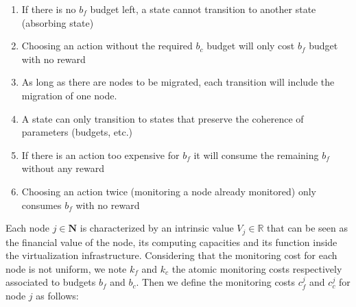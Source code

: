 \begin{enumerate}
    \item If there is no $b_f$ budget left, a state cannot transition to another state (absorbing state)
    \label{cond:c1}
    \item Choosing an action without the required $b_c$ budget will only cost $b_f$ budget with no reward
    \label{cond:c2}
    \item As long as there are nodes to be migrated, each transition will include the migration of one node.
    \label{cond:c3}
    \item A state can only transition to states that preserve the coherence of parameters (budgets, etc.)
    \label{cond:c4}
    \item If there is an action too expensive for $b_f$ it will consume the remaining $b_f$ without any reward
    \label{cond:c5}
    \item Choosing an action twice (\ie monitoring a node already monitored) only consumes $b_f$ with no reward
    \label{cond:c6}
 \end{enumerate}

Each node $j \in \textbf{N}$ is characterized by an intrinsic value $V_j \in \mathbb{R}$ that can be seen as the financial value of the node, its computing capacities and its function inside the virtualization infrastructure. 
Considering that the monitoring cost for each node is not uniform, we note $k_{f}$ and $k_{c}$ the atomic monitoring costs respectively associated to budgets $b_f$ and $b_c$.
Then we define the monitoring costs $c_f^j$ and $c_c^j$ for node $j$ as follows:

